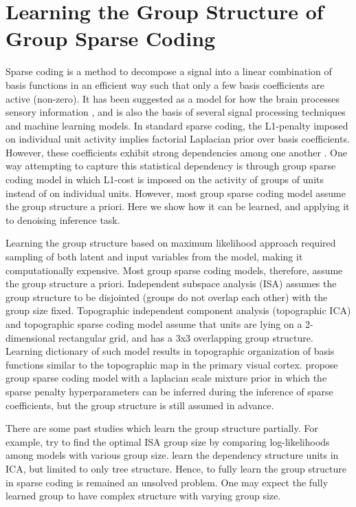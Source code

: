 \chapter{Learning the Group Structure of Group Sparse Coding}
\label{chap:group_sparse_coding}

Sparse coding is a method to decompose a signal into a linear combination of basis functions in an efficient way such that only a few basis coefficients are active (non-zero). It has been suggested as a model for how the brain processes sensory information \cite{ob96, ob97, rd02}, and is also the basis of several signal processing techniques and machine learning models. In standard sparse coding, the L1-penalty imposed on individual unit activity implies factorial Laplacian prior over basis coefficients. However, these coefficients exhibit strong dependencies among one another \cite{zc99, se01, ky09}. One way attempting to capture this statistical dependency is through group sparse coding model in which L1-cost is imposed on the activity of groups of units instead of on individual units. However, most group sparse coding model assume the group structure a priori. Here we show how it can be learned, and applying it to denoising inference task.

Learning the group structure based on maximum likelihood approach required sampling of both latent and input variables from the model, making it computationally expensive. Most group sparse coding models, therefore, assume the group structure a priori. Independent subspace analysis (ISA) \cite{ha00} assumes the group structure to be disjointed (groups do not overlap each other) with the group size fixed. Topographic independent component analysis (topographic ICA) \cite{ha01ica} and topographic sparse coding model \cite{ha01sc} assume that units are lying on a 2-dimensional rectangular grid, and has a 3x3 overlapping group structure. Learning dictionary of such model results in topographic organization of basis functions similar to the topographic map in the primary visual cortex. \textcite{pg10} propose group sparse coding model with a laplacian scale mixture prior in which the sparse penalty hyperparameters can be inferred during the inference of sparse coefficients, but the group structure is still assumed in advance.

There are some past studies which learn the group structure partially. For example, \textcite{ha07} try to find the optimal ISA group size by comparing log-likelihoods among models with various group size. \textcite{zd09} learn the dependency structure units in ICA, but limited to only tree structure.  Hence, to fully learn the group structure in sparse coding is remained an unsolved problem. One may expect the fully learned group to have complex structure with varying group size.

